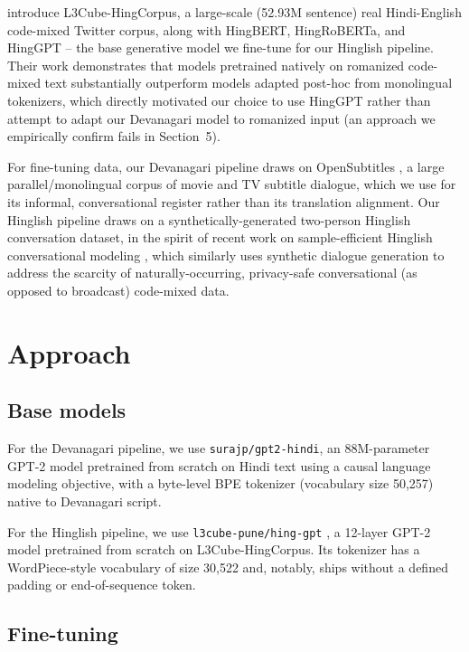 \documentclass[11pt]{article}
\begin{document}
\citet{nayak2022l3cube} introduce L3Cube-HingCorpus, a large-scale (52.93M sentence) real Hindi-English code-mixed Twitter corpus, along with HingBERT, HingRoBERTa, and HingGPT -- the base generative model we fine-tune for our Hinglish pipeline. Their work demonstrates that models pretrained natively on romanized code-mixed text substantially outperform models adapted post-hoc from monolingual tokenizers, which directly motivated our choice to use HingGPT rather than attempt to adapt our Devanagari model to romanized input (an approach we empirically confirm fails in Section~5).

For fine-tuning data, our Devanagari pipeline draws on OpenSubtitles \citep{lison2016opensubtitles}, a large parallel/monolingual corpus of movie and TV subtitle dialogue, which we use for its informal, conversational register rather than its translation alignment. Our Hinglish pipeline draws on a synthetically-generated two-person Hinglish conversation dataset, in the spirit of recent work on sample-efficient Hinglish conversational modeling \citep{singh2025sampleefficient}, which similarly uses synthetic dialogue generation to address the scarcity of naturally-occurring, privacy-safe conversational (as opposed to broadcast) code-mixed data.

\section{Approach}

\subsection{Base models}

For the Devanagari pipeline, we use \texttt{surajp/gpt2-hindi}, an 88M-parameter GPT-2 model pretrained from scratch on Hindi text using a causal language modeling objective, with a byte-level BPE tokenizer (vocabulary size 50{,}257) native to Devanagari script.

For the Hinglish pipeline, we use \texttt{l3cube-pune/hing-gpt} \citep{nayak2022l3cube}, a 12-layer GPT-2 model pretrained from scratch on L3Cube-HingCorpus. Its tokenizer has a WordPiece-style vocabulary of size 30{,}522 and, notably, ships without a defined padding or end-of-sequence token.

\subsection{Fine-tuning}
\end{document}
